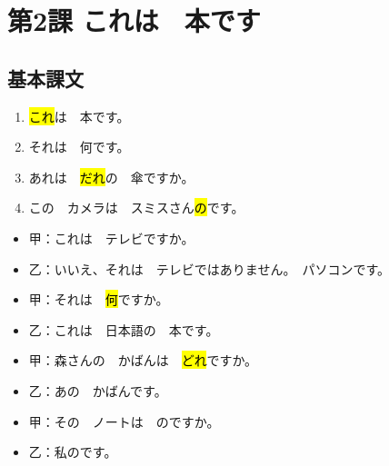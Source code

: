 \section{第2課 これは　本です}


\subsection{基本課文}

\begin{enumerate}
    \item \hl{これ}は　本です。
    \item それは　何です。
    \item あれは　\hl{だれ}の　傘ですか。
    \item この　カメラは　スミスさん\hl{の}です。
\end{enumerate}

\begin{itemize}
    \item 甲：これは　テレビですか。
    \item 乙：いいえ、それは　テレビではありません。　パソコンです。
\end{itemize}

\begin{itemize}
    \item 甲：それは　\hl{何}ですか。
    \item 乙：これは　日本語の　本です。
\end{itemize}

\begin{itemize}
    \item 甲：森さんの　かばんは　\hl{どれ}ですか。
    \item 乙：あの　かばんです。
\end{itemize}

\begin{itemize}
    \item 甲：その　ノートは　\hl{}のですか。
    \item 乙：私のです。
\end{itemize}


